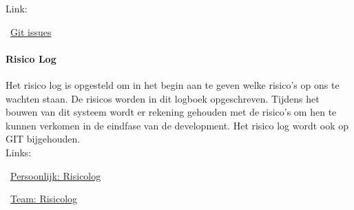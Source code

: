 \documentclass{article}
\begin{document}
Link:

\MVAt~\href{https://github.com/Gewad/Project4Bankalicious/issues}{Git issues}

\paragraph{Risico Log}
Het risico log is opgesteld om in het begin aan te geven
welke risico's op ons te wachten staan.
De risicos worden in dit logboek opgeschreven.
Tijdens het bouwen van dit systeem wordt er rekening gehouden met de risico's
om hen te kunnen verkomen in de eindfase van de development.
Het risico log wordt ook op GIT bijgehouden.\\

Links:

\MVAt~\href{https://github.com/Gewad/Project4Bankalicious/blob/test/opdrachten/opdracht_h}{Persoonlijk: Risicolog}

\MVAt~\href{https://github.com/Gewad/Project4Bankalicious/blob/test/opdrachten/opdracht_h/opdracht_h_teamonderdeel.xlsx}{Team: Risicolog}
\end{document}
